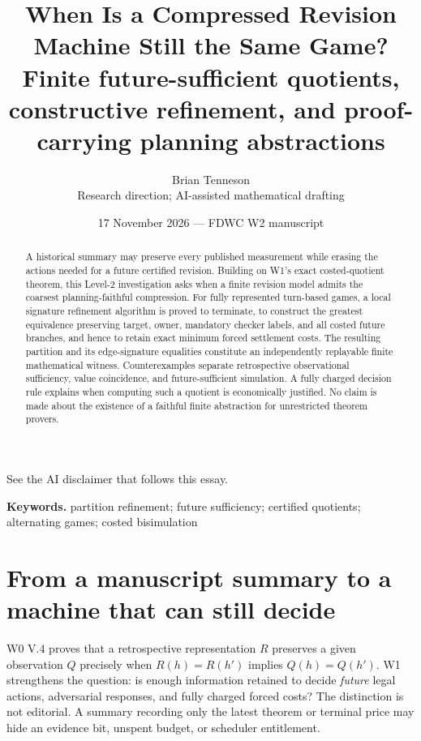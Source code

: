 \documentclass[11pt,letterpaper]{article}
\theoremstyle{definition}
\theoremstyle{remark}
\begin{document}
\newcommand{\leveltag}{W2}
\title{\bfseries\LARGE When Is a Compressed Revision Machine Still the Same Game?\\[0.45em]\large Finite future-sufficient quotients, constructive refinement, and proof-carrying planning abstractions}
\author{Brian Tenneson\\\normalsize Research direction; AI-assisted mathematical drafting}
\date{17 November 2026 --- FDWC W2 manuscript}
\maketitle
\begin{center}\small See the AI disclaimer that follows this essay.\end{center}
\begin{abstract}A historical summary may preserve every published measurement while erasing the actions needed for a future certified revision. Building on W1's exact costed-quotient theorem, this Level-2 investigation asks when a finite revision model admits the coarsest planning-faithful compression. For fully represented turn-based games, a local signature refinement algorithm is proved to terminate, to construct the greatest equivalence preserving target, owner, mandatory checker labels, and all costed future branches, and hence to retain exact minimum forced settlement costs. The resulting partition and its edge-signature equalities constitute an independently replayable finite mathematical witness. Counterexamples separate retrospective observational sufficiency, value coincidence, and future-sufficient simulation. A fully charged decision rule explains when computing such a quotient is economically justified. No claim is made about the existence of a faithful finite abstraction for unrestricted theorem provers.\end{abstract}
\noindent\textbf{Keywords.} partition refinement; future sufficiency; certified quotients; alternating games; costed bisimulation
\tableofcontents
\newpage

\section{From a manuscript summary to a machine that can still decide}
W0 V.4 proves that a retrospective representation $R$ preserves a given observation $Q$ precisely when $R(h)=R(h')$ implies $Q(h)=Q(h')$. W1 strengthens the question: is enough information retained to decide \emph{future} legal actions, adversarial responses, and fully charged forced costs? The distinction is not editorial. A summary recording only the latest theorem or terminal price may hide an evidence bit, unspent budget, or scheduler entitlement.
\end{document}
